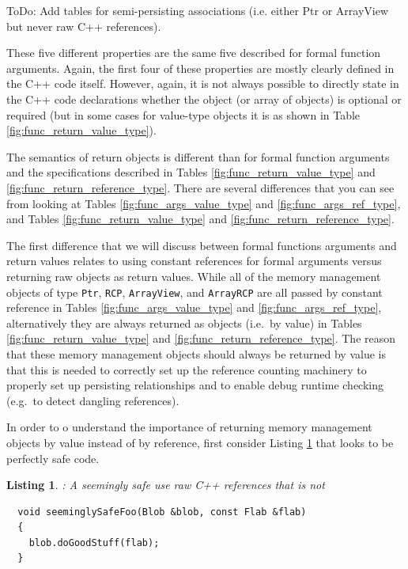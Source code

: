 \documentclass[pdf,ps2pdf,11pt]{SANDreport}
\newtheorem{listing}{Listing}
\begin{document}
ToDo: Add tables for semi-persisting associations (i.e. either Ptr or
ArrayView but never raw C++ references).


These five different properties are the same five described for formal
function arguments.  Again, the first four of these properties are
mostly clearly defined in the C++ code itself.  However, again, it is
not always possible to directly state in the C++ code declarations
whether the object (or array of objects) is optional or required (but
in some cases for value-type objects it is as shown in Table
{}\ref{fig:func_return_value_type}).

The semantics of return objects is different than for formal function
arguments and the specifications described in Tables
{}\ref{fig:func_return_value_type} and
{}\ref{fig:func_return_reference_type}.  There are several differences
that you can see from looking at Tables
{}\ref{fig:func_args_value_type} and {}\ref{fig:func_args_ref_type},
and Tables {}\ref{fig:func_return_value_type} and
{}\ref{fig:func_return_reference_type}.

The first difference that we will discuss between formal functions
arguments and return values relates to using constant references for
formal arguments versus returning raw objects as return values.  While
all of the memory management objects of type {}\texttt{Ptr},
{}\texttt{RCP}, {}\texttt{ArrayView}, and {}\texttt{ArrayRCP} are all
passed by constant reference in Tables
{}\ref{fig:func_args_value_type} and {}\ref{fig:func_args_ref_type},
alternatively they are always returned as objects (i.e.\ by value) in
Tables {}\ref{fig:func_return_value_type} and
{}\ref{fig:func_return_reference_type}.  The reason that these memory
management objects should always be returned by value is that this is
needed to correctly set up the reference counting machinery to
properly set up persisting relationships and to enable debug runtime
checking (e.g.\ to detect dangling references).

In order to o understand the importance of returning memory management
objects by value instead of by reference, first consider Listing
{}\ref{listing:unsafe_raw_C++_reference1} that looks to be perfectly
safe code.

\begin{listing}: A seemingly safe use raw C++ references that is not \\
\label{listing:unsafe_raw_C++_reference1}
{\small\begin{verbatim}
  void seeminglySafeFoo(Blob &blob, const Flab &flab)
  {
    blob.doGoodStuff(flab);
  }
\end{verbatim}}
\end{listing}
\end{document}

